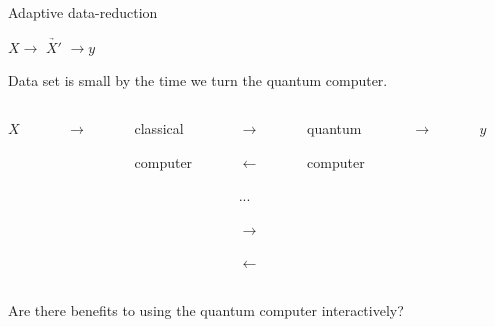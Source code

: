 \documentclass[
  ignorenonframetext,
]{beamer}
\begin{document}
\begin{frame}{Adaptive data-reduction}
\protect\hypertarget{adaptive-data-reduction}{}
\begin{center}
$X \rightarrow$  $\underrightarrow{X'}$  $\rightarrow y$
\end{center}

Data set is small by the time we turn the quantum computer.

\pause

\begin{columns}[T]
\begin{column}{.05\textwidth}
\vspace{0.6cm}
\centering
$X$
\end{column}
\begin{column}{.05\textwidth}
\vspace{0.7cm}
\centering
$\rightarrow$
\end{column}

\begin{column}{.375\textwidth}
\begin{block}{}
\centering
classical 

computer
\end{block}
\end{column}

\begin{column}{.05\textwidth}
\vspace{0.3cm}
\centering

$\rightarrow$

\vspace{-0.3cm}

$\leftarrow$

\vspace{-0.3cm}
...
\vspace{-0.2cm}

$\rightarrow$

\vspace{-0.2cm}

$\leftarrow$

\end{column}

\begin{column}{.375\textwidth}
\begin{block}{}
\centering
quantum

computer
\end{block}
\end{column}

\begin{column}{.05\textwidth}
\vspace{0.7cm}
\centering
$\rightarrow$
\end{column}


\begin{column}{.05\textwidth}
\vspace{0.6cm}
\centering
$y$
\end{column}
\end{columns}

Are there benefits to using the quantum computer interactively?
\end{frame}
\end{document}

